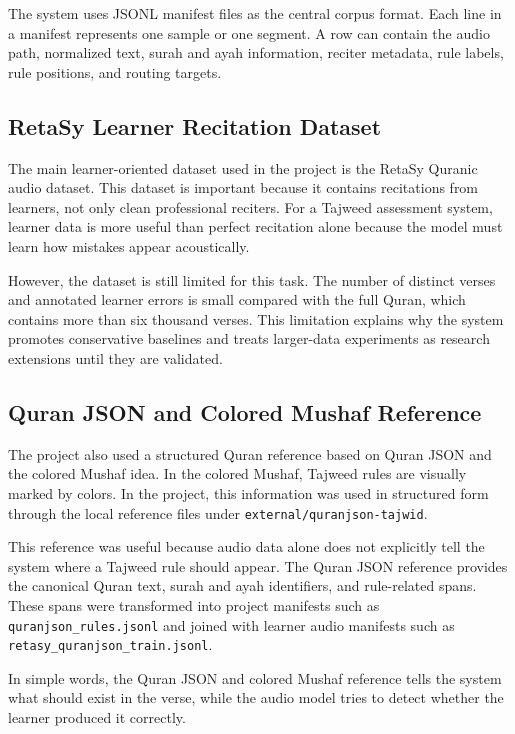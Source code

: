 \documentclass[12pt,a4paper]{report}
\begin{document}
The system uses JSONL manifest files as the central corpus format. Each line in
a manifest represents one sample or one segment. A row can contain the audio
path, normalized text, surah and ayah information, reciter metadata, rule labels,
rule positions, and routing targets.

\subsection{RetaSy Learner Recitation Dataset}

The main learner-oriented dataset used in the project is the RetaSy Quranic
audio dataset. This dataset is important because it contains recitations from
learners, not only clean professional reciters. For a Tajweed assessment system,
learner data is more useful than perfect recitation alone because the model must
learn how mistakes appear acoustically.

However, the dataset is still limited for this task. The number of distinct
verses and annotated learner errors is small compared with the full Quran, which
contains more than six thousand verses. This limitation explains why the system
promotes conservative baselines and treats larger-data experiments as research
extensions until they are validated.

\subsection{Quran JSON and Colored Mushaf Reference}

The project also used a structured Quran reference based on Quran JSON and the
colored Mushaf idea. In the colored Mushaf, Tajweed rules are visually marked by
colors. In the project, this information was used in structured form through the
local reference files under \texttt{external/quranjson-tajwid}.

This reference was useful because audio data alone does not explicitly tell the
system where a Tajweed rule should appear. The Quran JSON reference provides the
canonical Quran text, surah and ayah identifiers, and rule-related spans. These
spans were transformed into project manifests such as
\texttt{quranjson\_rules.jsonl} and joined with learner audio manifests such as
\texttt{retasy\_quranjson\_train.jsonl}.

In simple words, the Quran JSON and colored Mushaf reference tells the system
what should exist in the verse, while the audio model tries to detect whether
the learner produced it correctly.
\end{document}
